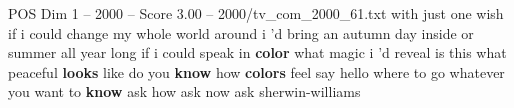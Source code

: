 \begin{textsample}{POS Dim 1 – 2000 – Score 3.00 – 2000/tv\_com\_2000\_61.txt}  \label{ex:f1_pos_079}
with just one wish if i could change my whole world around i 'd bring an autumn day inside or summer all year long if i could speak in \textbf{color} what magic i 'd reveal is this what peaceful \textbf{looks} like do you \textbf{know} how \textbf{colors} feel say hello where to go whatever you want to \textbf{know} ask how ask now ask sherwin-williams

\end{textsample}
